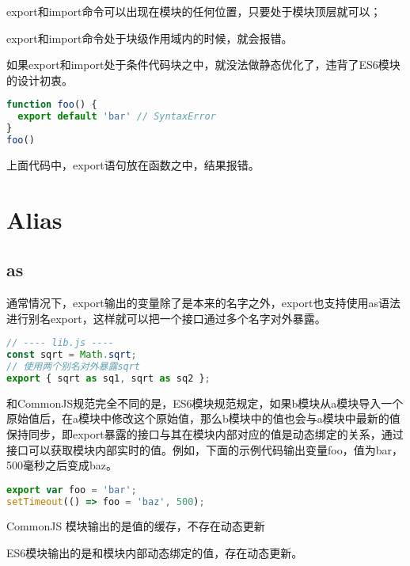 \begin{compactitem}
\item export和import命令可以出现在模块的任何位置，只要处于模块顶层就可以；
\item export和import命令处于块级作用域内的时候，就会报错。
\end{compactitem}


如果export和import处于条件代码块之中，就没法做静态优化了，违背了ES6模块的设计初衷。

\begin{lstlisting}[language=JavaScript]
function foo() {
  export default 'bar' // SyntaxError
}
foo()
\end{lstlisting}

上面代码中，export语句放在函数之中，结果报错。



\section{Alias}


\subsection{as}


通常情况下，export输出的变量除了是本来的名字之外，export也支持使用as语法进行别名export，这样就可以把一个接口通过多个名字对外暴露。

\begin{lstlisting}[language=JavaScript]
// ---- lib.js ----
const sqrt = Math.sqrt;
// 使用两个别名对外暴露sqrt
export { sqrt as sq1, sqrt as sq2 };
\end{lstlisting}

和CommonJS规范完全不同的是，ES6模块规范规定，如果b模块从a模块导入一个原始值后，在a模块中修改这个原始值，那么b模块中的值也会与a模块中最新的值保持同步，即export暴露的接口与其在模块内部对应的值是动态绑定的关系，通过接口可以获取模块内部实时的值。例如，下面的示例代码输出变量foo，值为bar，500毫秒之后变成baz。


\begin{lstlisting}[language=JavaScript]
export var foo = 'bar';
setTimeout(() => foo = 'baz', 500);
\end{lstlisting}

\begin{compactitem}
\item CommonJS 模块输出的是值的缓存，不存在动态更新
\item ES6模块输出的是和模块内部动态绑定的值，存在动态更新。
\end{compactitem}


